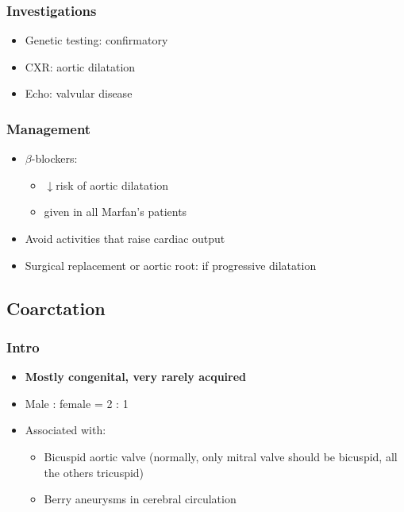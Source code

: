\documentclass[
  12pt,
]{memoir}
\providecommand{\tightlist}{%
  \setlength{\itemsep}{0pt}\setlength{\parskip}{0pt}}
\begin{document}
\hypertarget{investigations-6}{%
\subsubsection{Investigations}\label{investigations-6}}

\begin{itemize}
\tightlist
\item
  Genetic testing: confirmatory
\item
  CXR: aortic dilatation
\item
  Echo: valvular disease
\end{itemize}

\hypertarget{management-8}{%
\subsubsection{Management}\label{management-8}}

\begin{itemize}
\tightlist
\item
  \(\beta\)-blockers:

  \begin{itemize}
  \tightlist
  \item
    \(\downarrow\)risk of aortic dilatation
  \item
    given in all Marfan's patients
  \end{itemize}
\item
  Avoid activities that raise cardiac output
\item
  Surgical replacement or aortic root: if progressive dilatation
\end{itemize}

\hypertarget{coarctation}{%
\subsection{Coarctation}\label{coarctation}}

\hypertarget{intro-7}{%
\subsubsection{Intro}\label{intro-7}}

\begin{itemize}
\tightlist
\item
  \textbf{Mostly congenital, very rarely acquired}
\item
  Male : female = 2 : 1
\item
  Associated with:

  \begin{itemize}
  \tightlist
  \item
    Bicuspid aortic valve (normally, only mitral valve should be
    bicuspid, all the others tricuspid)
  \item
    Berry aneurysms in cerebral circulation
  \end{itemize}
\end{itemize}
\end{document}
